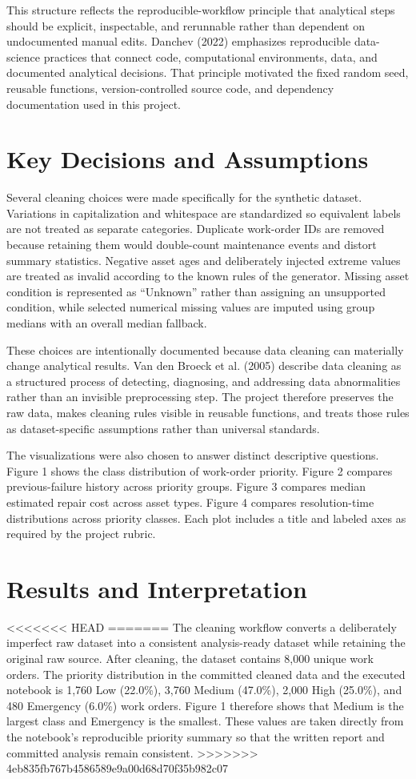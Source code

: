 \documentclass[12pt]{article}
\begin{document}
This structure reflects the reproducible-workflow principle that analytical steps should be explicit, inspectable, and rerunnable rather than dependent on undocumented manual edits. Danchev (2022) emphasizes reproducible data-science practices that connect code, computational environments, data, and documented analytical decisions. That principle motivated the fixed random seed, reusable functions, version-controlled source code, and dependency documentation used in this project.

\section*{Key Decisions and Assumptions}
Several cleaning choices were made specifically for the synthetic dataset. Variations in capitalization and whitespace are standardized so equivalent labels are not treated as separate categories. Duplicate work-order IDs are removed because retaining them would double-count maintenance events and distort summary statistics. Negative asset ages and deliberately injected extreme values are treated as invalid according to the known rules of the generator. Missing asset condition is represented as ``Unknown'' rather than assigning an unsupported condition, while selected numerical missing values are imputed using group medians with an overall median fallback.

These choices are intentionally documented because data cleaning can materially change analytical results. Van den Broeck et al. (2005) describe data cleaning as a structured process of detecting, diagnosing, and addressing data abnormalities rather than an invisible preprocessing step. The project therefore preserves the raw data, makes cleaning rules visible in reusable functions, and treats those rules as dataset-specific assumptions rather than universal standards.

The visualizations were also chosen to answer distinct descriptive questions. Figure 1 shows the class distribution of work-order priority. Figure 2 compares previous-failure history across priority groups. Figure 3 compares median estimated repair cost across asset types. Figure 4 compares resolution-time distributions across priority classes. Each plot includes a title and labeled axes as required by the project rubric.

\section*{Results and Interpretation}
<<<<<<< HEAD
=======
The cleaning workflow converts a deliberately imperfect raw dataset into a consistent analysis-ready dataset while retaining the original raw source. After cleaning, the dataset contains 8,000 unique work orders. The priority distribution in the committed cleaned data and the executed notebook is 1,760 Low (22.0\%), 3,760 Medium (47.0\%), 2,000 High (25.0\%), and 480 Emergency (6.0\%) work orders. Figure 1 therefore shows that Medium is the largest class and Emergency is the smallest. These values are taken directly from the notebook's reproducible priority summary so that the written report and committed analysis remain consistent.
>>>>>>> 4eb835fb767b4586589e9a00d68d70f35b982c07
\end{document}
